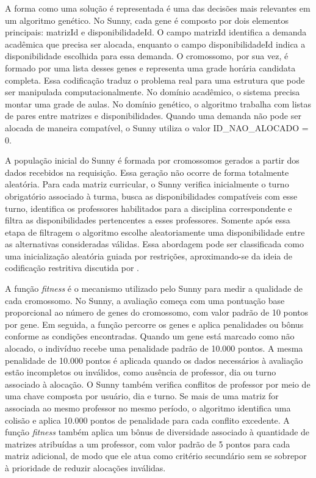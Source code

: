 A forma como uma solução é representada é uma das decisões mais relevantes em um algoritmo genético. No Sunny, cada gene é composto por dois elementos principais: matrizId e disponibilidadeId. O campo matrizId identifica a demanda acadêmica que precisa ser alocada, enquanto o campo disponibilidadeId indica a disponibilidade escolhida para essa demanda. O cromossomo, por sua vez, é formado por uma lista desses genes e representa uma grade horária candidata completa. Essa codificação traduz o problema real para uma estrutura que pode ser manipulada computacionalmente. No domínio acadêmico, o sistema precisa montar uma grade de aulas. No domínio genético, o algoritmo trabalha com listas de pares entre matrizes e disponibilidades. Quando uma demanda não pode ser alocada de maneira compatível, o Sunny utiliza o valor ID\_NAO\_ALOCADO = 0.

A população inicial do Sunny é formada por cromossomos gerados a partir dos dados recebidos na requisição. Essa geração não ocorre de forma totalmente aleatória. Para cada matriz curricular, o Sunny verifica inicialmente o turno obrigatório associado à turma, busca as disponibilidades compatíveis com esse turno, identifica os professores habilitados para a disciplina correspondente e filtra as disponibilidades pertencentes a esses professores. Somente após essa etapa de filtragem o algoritmo escolhe aleatoriamente uma disponibilidade entre as alternativas consideradas válidas. Essa abordagem pode ser classificada como uma inicialização aleatória guiada por restrições, aproximando-se da ideia de codificação restritiva discutida por .

A função \textit{fitness} é o mecanismo utilizado pelo Sunny para medir a qualidade de cada cromossomo. No Sunny, a avaliação começa com uma pontuação base proporcional ao número de genes do cromossomo, com valor padrão de 10 pontos por gene. Em seguida, a função percorre os genes e aplica penalidades ou bônus conforme as condições encontradas. Quando um gene está marcado como não alocado, o indivíduo recebe uma penalidade padrão de 10.000 pontos. A mesma penalidade de 10.000 pontos é aplicada quando os dados necessários à avaliação estão incompletos ou inválidos, como ausência de professor, dia ou turno associado à alocação. O Sunny também verifica conflitos de professor por meio de uma chave composta por usuário, dia e turno. Se mais de uma matriz for associada ao mesmo professor no mesmo período, o algoritmo identifica uma colisão e aplica 10.000 pontos de penalidade para cada conflito excedente. A função \textit{fitness} também aplica um bônus de diversidade associado à quantidade de matrizes atribuídas a um professor, com valor padrão de 5 pontos para cada matriz adicional, de modo que ele atua como critério secundário sem se sobrepor à prioridade de reduzir alocações inválidas.

